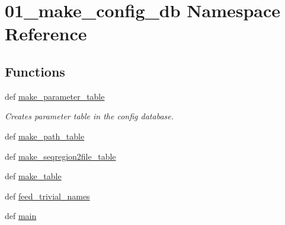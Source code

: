 \hypertarget{namespace01__make__config__db}{\section{01\-\_\-make\-\_\-config\-\_\-db Namespace Reference}
\label{namespace01__make__config__db}
}
\subsection*{Functions}
\begin{DoxyCompactItemize}
\item 
def \hyperlink{namespace01__make__config__db_a0daafb96bf35aa84ae7232f2567efff3}{make\-\_\-parameter\-\_\-table}
\begin{DoxyCompactList}\small\item\em Creates parameter table in the config database. \end{DoxyCompactList}\item 
def \hyperlink{namespace01__make__config__db_a29e30ce9e84cfb89b5c7f863ec02d077}{make\-\_\-path\-\_\-table}
\item 
def \hyperlink{namespace01__make__config__db_a14cfee12782322380a93c1fa5f6ad2be}{make\-\_\-seqregion2file\-\_\-table}
\item 
def \hyperlink{namespace01__make__config__db_a872265b6708da3bd70cedbcd37d549e0}{make\-\_\-table}
\item 
def \hyperlink{namespace01__make__config__db_a8b88f04e01b299c3b48ad30c73b93fc6}{feed\-\_\-trivial\-\_\-names}
\item 
def \hyperlink{namespace01__make__config__db_a34edba03ca6b516d8392f6360b99fa62}{main}
\end{DoxyCompactItemize}


